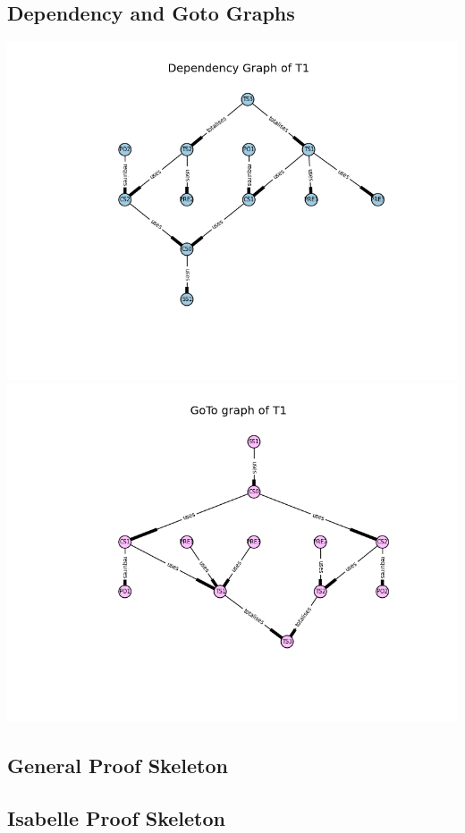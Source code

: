 \subsection{Dependency and Goto Graphs}
\label{app:vm2.5}
\includegraphics[scale=0.7]{examples/vm/25a.png}
\includegraphics[scale=0.7]{examples/vm/25b.png}
\subsection{General Proof Skeleton}
\label{app:vm3}

\subsection{Isabelle Proof Skeleton}
\label{app:vm4}

